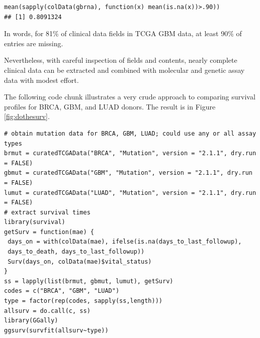 
\begin{shaded}
\begin{verbatim}
mean(sapply(colData(gbrna), function(x) mean(is.na(x))>.90))
## [1] 0.8091324
\end{verbatim}
\end{shaded}

In words, for 81\% of clinical data fields in TCGA GBM data,
at least 90\% of entries are missing.

Nevertheless, with careful inspection of fields and contents,
nearly complete clinical data can be extracted and combined with molecular
and genetic assay data with modest effort.

The following code chunk illustrates a very crude
approach to comparing survival profiles for BRCA, GBM, and LUAD
donors. The result is in Figure \ref{fig:dothesurv}.


{\small
\begin{shaded}
\begin{verbatim}
# obtain mutation data for BRCA, GBM, LUAD; could use any or all assay types
brmut = curatedTCGAData("BRCA", "Mutation", version = "2.1.1", dry.run = FALSE)
gbmut = curatedTCGAData("GBM", "Mutation", version = "2.1.1", dry.run = FALSE)
lumut = curatedTCGAData("LUAD", "Mutation", version = "2.1.1", dry.run = FALSE)
# extract survival times
library(survival)
getSurv = function(mae) {
 days_on = with(colData(mae), ifelse(is.na(days_to_last_followup),
 days_to_death, days_to_last_followup))
 Surv(days_on, colData(mae)$vital_status)
}
ss = lapply(list(brmut, gbmut, lumut), getSurv)
codes = c("BRCA", "GBM", "LUAD")
type = factor(rep(codes, sapply(ss,length)))
allsurv = do.call(c, ss)
library(GGally)
ggsurv(survfit(allsurv~type))
\end{verbatim}
\end{shaded}
}

